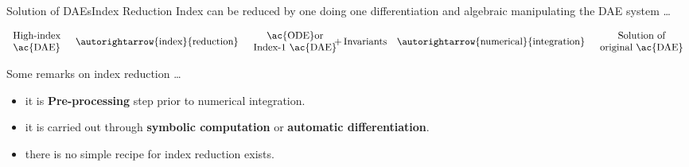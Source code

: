 \begin{frame}{Solution of \aclp{DAE}}{Index Reduction}
  Index can be reduced by one doing one differentiation and algebraic manipulating the \ac{DAE} system \dots
  \begin{bbox}
  \vspace{-1.0em}
  \begin{equation*}
      \begin{array}{c}
        \text{High-index} \\
        \text{\ac{DAE}}
      \end{array}
      \quad \autorightarrow{\text{index}}{\text{reduction}} \quad
      \begin{array}{c}
        \text{\ac{ODE}}
        \text{or} \\
        \text{Index-1 \ac{DAE}}  \\
      \end{array} {\hspace{-0.75em}+\,\text{Invariants}}
      \quad \autorightarrow{\text{numerical}}{\text{integration}} \quad
      \begin{array}{c}
        \text{Solution of} \\
        \text{original \ac{DAE}}
      \end{array}
    \end{equation*}
  \end{bbox}
  \vspace{1.0em}
  Some remarks on index reduction \dots
  \begin{itemize}
    \item it is \textbf{Pre-processing} step prior to numerical integration.
    \item it is carried out through \textbf{symbolic computation} or \textbf{automatic differentiation}.
    \item there is no simple recipe for index reduction exists.
  \end{itemize}
\end{frame}

